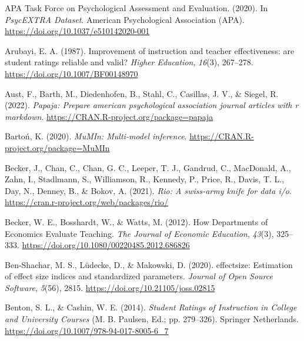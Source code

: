 \documentclass[
  man]{apa7}
\newlength{\cslhangindent}
\newlength{\cslentryspacingunit} %
\newenvironment{CSLReferences}[2] %
 {%
  \setlength{\parindent}{0pt}
  \ifodd #1
  \let\oldpar\par
  \def\par{\hangindent=\cslhangindent\oldpar}
  \fi
  \setlength{\parskip}{#2\cslentryspacingunit}
 }%
 {}
\begin{document}
\hypertarget{refs}{}
\begin{CSLReferences}{1}{0}
\leavevmode{}%
APA Task Force on Psychological Assessment and Evaluation. (2020). In \emph{PsycEXTRA Dataset}. American Psychological Association (APA). \url{https://doi.org/10.1037/e510142020-001}

\leavevmode{}%
Arubayi, E. A. (1987). Improvement of instruction and teacher effectiveness: are student ratings reliable and valid? \emph{Higher Education}, \emph{16}(3), 267--278. \url{https://doi.org/10.1007/BF00148970}

\leavevmode{}%
Aust, F., Barth, M., Diedenhofen, B., Stahl, C., Casillas, J. V., \& Siegel, R. (2022). \emph{Papaja: Prepare american psychological association journal articles with r markdown}. \url{https://CRAN.R-project.org/package=papaja}

\leavevmode{}%
Bartoń, K. (2020). \emph{MuMIn: Multi-model inference}. \url{https://CRAN.R-project.org/package=MuMIn}

\leavevmode{}%
Becker, J., Chan, C., Chan, G. C., Leeper, T. J., Gandrud, C., MacDonald, A., Zahn, I., Stadlmann, S., Williamson, R., Kennedy, P., Price, R., Davis, T. L., Day, N., Denney, B., \& Bokov, A. (2021). \emph{Rio: A swiss-army knife for data i/o}. \url{https://cran.r-project.org/web/packages/rio/}

\leavevmode{}%
Becker, W. E., Bosshardt, W., \& Watts, M. (2012). How Departments of Economics Evaluate Teaching. \emph{The Journal of Economic Education}, \emph{43}(3), 325--333. \url{https://doi.org/10.1080/00220485.2012.686826}

\leavevmode{}%
Ben-Shachar, M. S., Lüdecke, D., \& Makowski, D. (2020). {e}ffectsize: Estimation of effect size indices and standardized parameters. \emph{Journal of Open Source Software}, \emph{5}(56), 2815. \url{https://doi.org/10.21105/joss.02815}

\leavevmode{}%
Benton, S. L., \& Cashin, W. E. (2014). \emph{Student Ratings of Instruction in College and University Courses} (M. B. Paulsen, Ed.; pp. 279--326). Springer Netherlands. \url{https://doi.org/10.1007/978-94-017-8005-6_7}


\end{CSLReferences}
\end{document}
